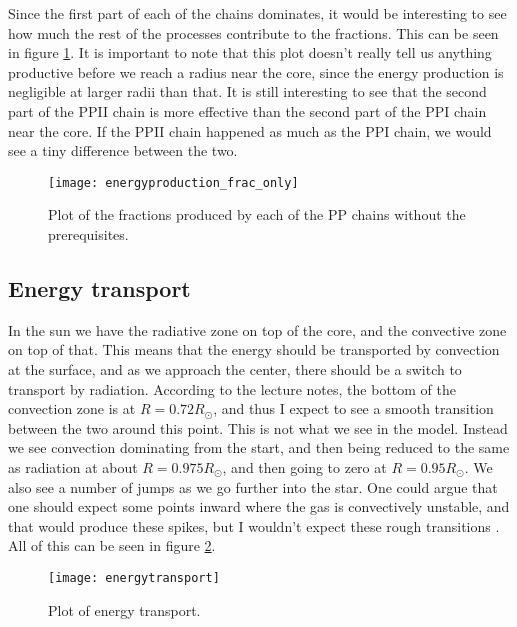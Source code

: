 \documentclass[a4paper,12pt]{article}
\begin{document}
Since the first part of each of the chains dominates, it would be interesting to see how much the rest of the processes contribute to the fractions. This can be seen in figure \ref{fig:energyproduction_frac_only}. It is important to note that this plot doesn't really tell us anything productive before we reach a radius near the core, since the energy production is negligible at larger radii than that. It is still interesting to see that the second part of the PPII chain is more effective than the second part of the PPI chain near the core. If the PPII chain happened as much as the PPI chain, we would see a tiny difference between the two.
\begin{figure}[H]
	\texttt{[image: energyproduction\_frac\_only]}
	\caption{Plot of the fractions produced by each of the PP chains without the prerequisites.}
	\label{fig:energyproduction_frac_only}
\end{figure}
\subsection{Energy transport}
In the sun we have the radiative zone on top of the core, and the convective zone on top of that. This means that the energy should be transported by convection at the surface, and as we approach the center, there should be a switch to transport by radiation. According to the lecture notes, the bottom of the convection zone is at $R = 0.72R_{\odot}$, and thus I expect to see a smooth transition between the two around this point.
This is not what we see in the model. Instead we see convection dominating from the start, and then being reduced to the same as radiation at about $R = 0.975R_{\odot}$, and then going to zero at $R = 0.95R_{\odot}$. We also see a number of jumps as we go further into the star. One could argue that one should expect some points inward where the gas is convectively unstable, and that would produce these spikes, but I wouldn't expect these rough transitions . All of this can be seen in figure \ref{fig:Energy transport}.
\begin{figure}[H]
	\texttt{[image: energytransport]}
	\caption{Plot of energy transport.}
	\label{fig:Energy transport}
\end{figure}
\end{document}

